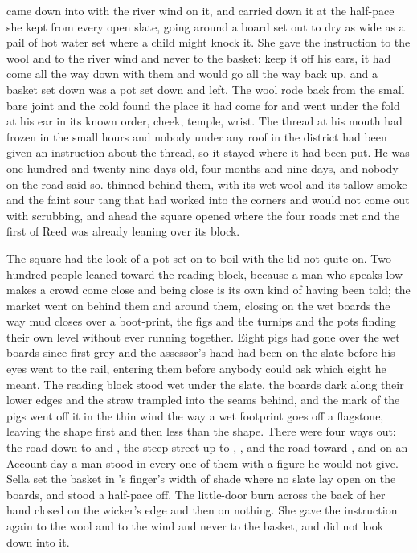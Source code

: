 
 came down into  with the river wind on it, and  carried  down it at the half-pace she kept from every open slate, going around a board set out to dry as wide as a pail of hot water set where a child might knock it. She gave the instruction to the wool and to the river wind and never to the basket: keep it off his ears, it had come all the way down with them and would go all the way back up, and a basket set down was a pot set down and left. The wool rode back from the small bare joint and the cold found the place it had come for and went under the fold at his ear in its known order, cheek, temple, wrist. The thread at his mouth had frozen in the small hours and nobody under any roof in the district had been given an instruction about the thread, so it stayed where it had been put. He was one hundred and twenty-nine days old, four months and nine days, and nobody on the road said so.  thinned behind them, with its wet wool and its tallow smoke and the faint sour tang that had worked into the corners and would not come out with scrubbing, and ahead the square opened where the four roads met and the first  of Reed was already leaning over its block.

The square had the look of a pot set on to boil with the lid not quite on. Two hundred people leaned toward the reading block, because a man who speaks low makes a crowd come close and being close is its own kind of having been told; the market went on behind them and around them, closing on the wet boards the way mud closes over a boot-print, the figs and the turnips and the pots finding their own level without ever running together. Eight pigs had gone over the wet boards since first grey and the assessor's hand had been on the slate before his eyes went to the rail, entering them before anybody could ask which eight he meant. The reading block stood wet under the slate, the boards dark along their lower edges and the straw trampled into the seams behind, and the mark of the pigs went off it in the thin wind the way a wet footprint goes off a flagstone, leaving the shape first and then less than the shape. There were four ways out: the road down to  and , the steep street up to , , and the road toward , and on an Account-day a man stood in every one of them with a figure he would not give. Sella set the basket in 's finger's width of shade where no slate lay open on the boards, and stood a half-pace off. The little-door burn across the back of her hand closed on the wicker's edge and then on nothing. She gave the instruction again to the wool and to the wind and never to the basket, and did not look down into it.

